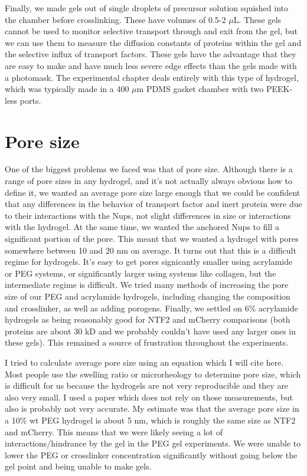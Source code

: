 Finally, we made gels out of single droplets of precursor solution squished into the chamber before crosslinking.  These have volumes of 0.5-2 $\mu$L.  These gels cannot be used to monitor selective transport through and exit from the gel, but we can use them to measure the diffusion constants of proteins within the gel and the selective influx of transport factors.  These gels have the advantage that they are easy to make and have much less severe edge effects than the gels made with a photomask.  The experimental chapter deals entirely with this type of hydrogel, which was typically made in a 400 $\mu$m PDMS gasket chamber with two PEEK-less ports.

\section{Pore size}

One of the biggest problems we faced was that of pore size.  Although there is a range of pore sizes in any hydrogel, and it's not actually always obvious how to define it, we wanted an average pore size large enough that we could be confident that any differences in the behavior of transport factor and inert protein were due to their interactions with the Nups, not slight differences in size or interactions with the hydrogel.  At the same time, we wanted the anchored Nups to fill a significant portion of the pore.  This meant that we wanted a hydrogel with pores somewhere between 10 and 20 nm on average.  It turns out that this is a difficult regime for hydrogels.  It's easy to get pores signicantly smaller using acrylamide or PEG systems, or significantly larger using systems like collagen, but the intermediate regime is difficult.  We tried many methods of increasing the pore size of our PEG and acrylamide hydrogels, including changing the composition and crosslinker, as well as adding porogens.  Finally, we settled on 6\% acrylamide hydrogels as being reasonably good for NTF2 and mCherry comparisons (both proteins are about 30 kD and we probably couldn't have used any larger ones in these gels).  This remained a source of frustration throughout the experiments.

I tried to calculate average pore size using an equation which I will cite here.  Most people use the swelling ratio or microrheology to determine pore size, which is difficult for us because the hydrogels are not very reproducible and they are also very small.  I used a paper which does not rely on those measurements, but also is probably not very accurate.  My estimate was that the average pore size in a 10\% wt PEG hydrogel is about 5 nm, which is roughly the same size as NTF2 and mCherry.  This means that we were likely seeing a lot of interactions/hindrance by the gel in the PEG gel experiments.  We were unable to lower the PEG or crosslinker concentration significantly without going below the gel point and being unable to make gels.

